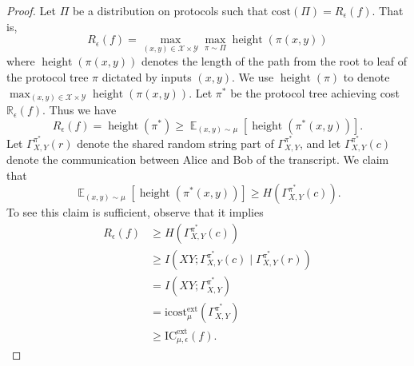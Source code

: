 \documentclass[11pt]{amsart}
\theoremstyle{plain}
\theoremstyle{definition}
\theoremstyle{plain}
\newcommand{\calX}{\mathcal{X}}
\newcommand{\calY}{\mathcal{Y}}
\newcommand{\cost}{\mathrm{cost}}
\newcommand{\ICext}{\mathrm{IC}^{\mathrm{ext}}}
\newcommand{\icostext}{\mathrm{icost}^{\mathrm{ext}}}
\newcommand{\R}{\mathbb{R}}
\DeclareMathOperator{\height}{height}
\DeclareMathOperator*{\E}{\mathbb{E}}
\begin{document}
\begin{proof}

Let $\Pi$ be a distribution on protocols such that $\cost(\Pi) = R_\epsilon(f)$. That is,
$$R_\epsilon(f) = \max_{(x,y) \in \calX\times\calY}\max_{\pi \sim \Pi}\height(\pi(x,y))$$ 
where $\height(\pi(x,y))$ denotes the length of the path from the root to leaf of the protocol tree $\pi$ dictated by inputs $(x,y)$. We use $\height(\pi)$ to denote $\max_{(x,y) \in \calX\times\calY}\height(\pi(x,y))$. Let $\pi^*$ be the protocol tree achieving cost $\R_\epsilon(f)$. Thus we have
$$R_\epsilon(f) = \height(\pi^*) \geq \E_{(x,y) \sim \mu} [\height(\pi^*(x,y))].$$
Let $\Gamma^{\pi^*}_{X,Y}(r)$ denote the shared random string part of $\Gamma^{\pi^*}_{X,Y}$, and let $\Gamma^{\pi^*}_{X,Y}(c)$ denote the communication between Alice and Bob of the transcript. We claim that
$$\E_{(x,y) \sim \mu} [\height(\pi^*(x,y))] \geq H(\Gamma^{\pi^*}_{X,Y}(c)).$$
To see this claim is sufficient, observe that it implies 
\begin{align*}
R_\epsilon(f) &\geq H(\Gamma^{\pi^*}_{X,Y}(c)) \\
&\geq I(XY; \Gamma^{\pi^*}_{X,Y}(c) \mid \Gamma^{\pi^*}_{X,Y}(r)) \\
&= I(XY ;\Gamma^{\pi^*}_{X,Y}) \\
&= \icostext_\mu(\Gamma^{\pi^*}_{X,Y})\\
&\geq \ICext_{\mu,\epsilon}(f).
\end{align*}


\end{proof}
\end{document}
